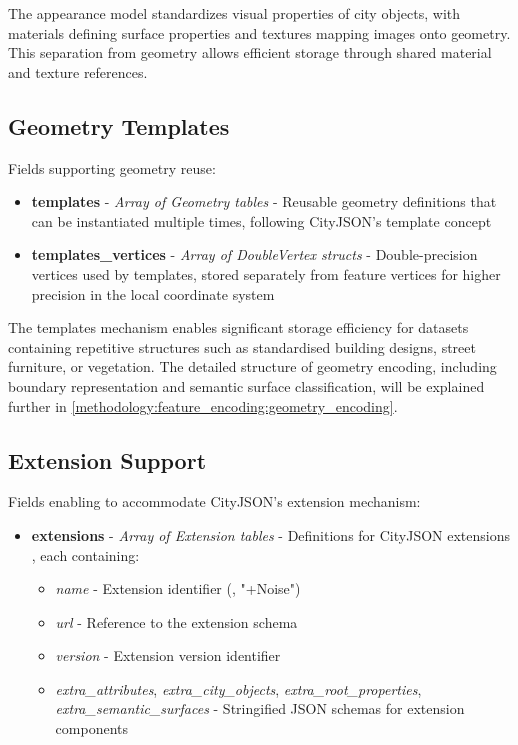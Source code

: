 The appearance model standardizes visual properties of city objects, with materials defining surface properties and textures mapping images onto geometry. This separation from geometry allows efficient storage through shared material and texture references.

\subsection{Geometry Templates}
\label{methodology:header:geometry_templates}

Fields supporting geometry reuse:

\begin{itemize}
  \item \textbf{templates} - \textit{Array of Geometry tables} - Reusable geometry definitions that can be instantiated multiple times, following CityJSON's template concept \citep{cityjson_spec}

  \item \textbf{templates\_vertices} - \textit{Array of DoubleVertex structs} - Double-precision vertices used by templates, stored separately from feature vertices for higher precision in the local coordinate system \citep{cityjson_spec}
\end{itemize}

The templates mechanism enables significant storage efficiency for datasets containing repetitive structures such as standardised building designs, street furniture, or vegetation. The detailed structure of geometry encoding, including boundary representation and semantic surface classification, will be explained further in \autoref{methodology:feature_encoding:geometry_encoding}.

\subsection{Extension Support}
\label{methodology:header:extensions}

Fields enabling to accommodate CityJSON's extension mechanism:

\begin{itemize}
  \item \textbf{extensions} - \textit{Array of Extension tables} - Definitions for CityJSON extensions \citep{cityjson_spec}, each containing:
    \begin{itemize}
      \item \textit{name} - Extension identifier (\eg, "+Noise")
      \item \textit{url} - Reference to the extension schema
      \item \textit{version} - Extension version identifier
      \item \textit{extra\_attributes}, \textit{extra\_city\_objects}, \textit{extra\_root\_properties}, \textit{extra\_semantic\_surfaces} - Stringified JSON schemas for extension components
    \end{itemize}
\end{itemize}

